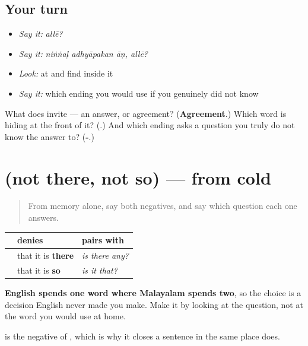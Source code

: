 \subsection*{Your turn}
\begin{itemize}
\raggedright
  \item \emph{Say it:} \emph{allē?}
  \item \emph{Say it:} \emph{niṅṅaḷ adhyāpakan āṇ, allē?}
  \item \emph{Look:} at \textbf{} and find \textbf{} inside it
  \item \emph{Say it:} which ending you would use if you genuinely did not know
\end{itemize}

\begin{tcolorbox}[breakable,colback=teal!4,colframe=teal!35!black,title={Before you move on}]
What does \textbf{} invite — an answer, or agreement? (\textbf{Agreement}.) Which word is hiding at the front of it? (\emph{\textbf{}}.) And which ending asks a question you truly do not know the answer to? (\textbf{-}.)
\end{tcolorbox}
\section[(not there, not so)]{(not there, not so) — from cold}

\label{lesson:ML-R77-not-so-recall}



\begin{quote}
From memory alone, say both negatives, and say which question each one answers.
\end{quote}

\begin{grammarlens}[title={Grammar Lens: one English word, two Malayalam ones}]
\noindent
\begin{tabularx}{\linewidth}{@{}>{\raggedright\arraybackslash}X>{\raggedright\arraybackslash}X>{\raggedright\arraybackslash}X@{}}
\toprule
\textbf{} & \textbf{denies} & \textbf{pairs with} \\
\midrule
\textbf{\ml{ഇല്ല}} & that it is \textbf{there} & \emph{is there any?} \\
\textbf{\ml{അല്ല}} & that it is \textbf{so} & \emph{is it that?} \\
\bottomrule
\end{tabularx}

\textbf{English spends one word where Malayalam spends two}, so the choice is a decision English never made you make. Make it by looking at the question, not at the word you would use at home.

\textbf{} is the negative of \textbf{}, which is why it closes a sentence in the same place  does.
\end{grammarlens}

